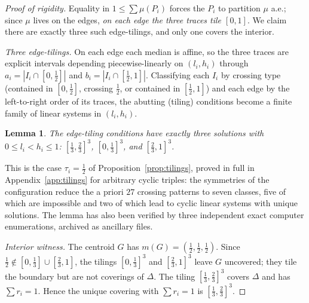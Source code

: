 \documentclass{aims}
\numberwithin{equation}{section}
\theoremstyle{plain}
\newtheorem{lemma}[theorem]{Lemma}
\theoremstyle{definition}
\theoremstyle{remark}
\begin{document}
\begin{proof}[Proof of rigidity]
Equality in $1\le\sum\mu(P_i)$ forces the $P_i$ to
partition $\mu$ a.e.; since $\mu$ lives on the edges, \emph{on each edge the three
traces tile $[0,1]$}. We claim there are exactly three such edge-tilings, and only
one covers the interior.

\emph{Three edge-tilings.} On each edge each median is affine, so the three traces
are explicit intervals depending piecewise-linearly on $(l_i,h_i)$ through
$a_i=|I_i\cap[0,\tfrac12]|$ and $b_i=|I_i\cap[\tfrac12,1]|$. Classifying each $I_i$ by
crossing type (contained in $[0,\tfrac12]$, crossing $\tfrac12$, or contained in
$[\tfrac12,1]$) and each edge by the left-to-right order of its traces, the abutting
(tiling) conditions become a finite family of linear systems in $(l_i,h_i)$.

\begin{lemma}\label{lem:three}
The edge-tiling conditions have exactly three solutions with $0\le l_i<h_i\le1$:
$[\tfrac13,\tfrac23]^3$, $[0,\tfrac13]^3$, and $[\tfrac23,1]^3$.
\end{lemma}
This is the case $\tau_i=\tfrac12$ of Proposition~\ref{prop:tilings}, proved in
full in Appendix~\ref{app:tilings} for arbitrary cyclic triples: the symmetries
of the configuration reduce the a priori $27$ crossing patterns to seven
classes, five of which are impossible and two of which lead to cyclic linear
systems with unique solutions. The lemma has also been verified by three
independent exact computer enumerations, archived as ancillary files.

\emph{Interior witness.} The centroid $G$ has $m(G)=(\tfrac12,\tfrac12,\tfrac12)$.
Since $\tfrac12\notin[0,\tfrac13]\cup[\tfrac23,1]$, the tilings $[0,\tfrac13]^3$ and
$[\tfrac23,1]^3$ leave $G$ uncovered; they tile the boundary but are not coverings
of $\Delta$. The tiling $[\tfrac13,\tfrac23]^3$ covers $\Delta$ and has
$\sum r_i=1$. Hence the unique covering with $\sum r_i=1$ is $[\tfrac13,\tfrac23]^3$.
\end{proof}
\end{document}
